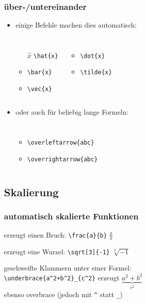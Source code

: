 \begin{frame}[fragile]
\frametitle{über-/untereinander}
\begin{itemize}
  \item<1-> einige Befehle machen dies automatisch:
  \begin{columns}
  \begin{itemize}
    \item[$\hat x$] \lstinline[style=Latex]+\hat{x}+
    \item[$\bar x$] \lstinline[style=Latex]+\bar{x}+
    \item[$\vec x$] \lstinline[style=Latex]+\vec{x}+
  \end{itemize}
  \begin{itemize}
    \item[$\dot x$] \lstinline[style=Latex]+\dot{x}+
    \item[$\tilde x$] \lstinline[style=Latex]+\tilde{x}+
  \end{itemize}
  \end{columns}
  \item<2-> oder auch für beliebig lange Formeln:
  \begin{columns}
  \begin{itemize}
    \item[$\overleftarrow{abc}$] \lstinline[style=Latex]+\overleftarrow{abc}+
    \item[$\overrightarrow{abc}$] \lstinline[style=Latex]+\overrightarrow{abc}+
  \end{itemize}
  \end{columns}
\end{itemize}
\end{frame}


\subsection{Skalierung}

\begin{frame}[fragile]
\frametitle{automatisch skalierte Funktionen}
\begin{description}[<+->]
  \item[frac] erzeugt einen Bruch: \lstinline[style=Latex]+\frac{a}{b}+ $\frac{a}{b}$
  \item[sqrt] erzeugt eine Wurzel: \lstinline[style=Latex]+\sqrt[3]{-1}+ $\sqrt[3]{-1}$
  \item[underbrace] geschweifte Klammern unter einer Formel: \\
    \lstinline[style=Latex]-\underbrace{a^2+b^2}_{c^2}- \hfill erzeugt \hfill $\underbrace{a^2+b^2}_{c^2}$\\
    ebenso overbrace (jedoch mit \lstinline[style=Latex]+^+ statt \lstinline[style=Latex]+_+)
\end{description}
\end{frame}


